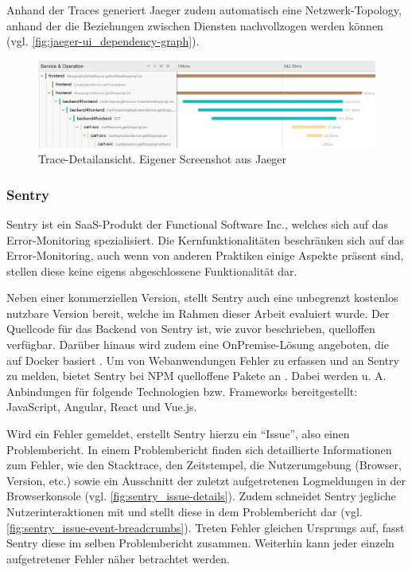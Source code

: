 Anhand der Traces generiert Jaeger zudem automatisch eine Netzwerk-Topology, anhand der die Beziehungen zwischen Diensten nachvollzogen werden können (vgl. \autoref{fig:jaeger-ui_dependency-graph}).

\begin{figure}[H]
	\centering
	\includegraphics[width=\linewidth]{img/03_methoden/jaeger_trace-detail-view.png}
	\caption{Trace-Detailansicht. Eigener Screenshot aus Jaeger}
	\label{fig:jaeger-ui_trace-detail-view}
\end{figure}

\subsubsection{Sentry}
\label{subsec:sentry}

Sentry \cite{Sentry} ist ein SaaS-Produkt der Functional Software Inc., welches sich auf das Error-Monitoring spezialisiert. Die Kernfunktionalitäten beschränken sich auf das Error-Monitoring, auch wenn von anderen Praktiken einige Aspekte präsent sind, stellen diese keine eigens abgeschlossene Funktionalität dar.

Neben einer kommerziellen Version, stellt Sentry auch eine unbegrenzt kostenlos nutzbare Version bereit, welche im Rahmen dieser Arbeit evaluiert wurde. Der Quellcode für das Backend von Sentry ist, wie zuvor beschrieben, quelloffen verfügbar. Darüber hinaus wird zudem eine OnPremise-Lösung angeboten, die auf Docker basiert \cite{SentrySelfHosted}. Um von Webanwendungen Fehler zu erfassen und an Sentry zu melden, bietet Sentry bei NPM \cite{NPM} quelloffene Pakete an \cite{SentryJSGithub}. Dabei werden u. A. Anbindungen für folgende Technologien bzw. Frameworks bereitgestellt: JavaScript, Angular, React und Vue.js.

Wird ein Fehler gemeldet, erstellt Sentry hierzu ein \enquote{Issue}, also einen Problembericht. In einem Problembericht finden sich detaillierte Informationen zum Fehler, wie den Stacktrace, den Zeitstempel, die Nutzerumgebung (Browser, Version, etc.) sowie ein Ausschnitt der zuletzt aufgetretenen Logmeldungen in der Browserkonsole (vgl. \autoref{fig:sentry_issue-details}). Zudem schneidet Sentry jegliche Nutzerinteraktionen mit und stellt diese in dem Problembericht dar (vgl. \autoref{fig:sentry_issue-event-breadcrumbs}). Treten Fehler gleichen Ursprungs auf, fasst Sentry diese im selben Problembericht zusammen. Weiterhin kann jeder einzeln aufgetretener Fehler näher betrachtet werden.

